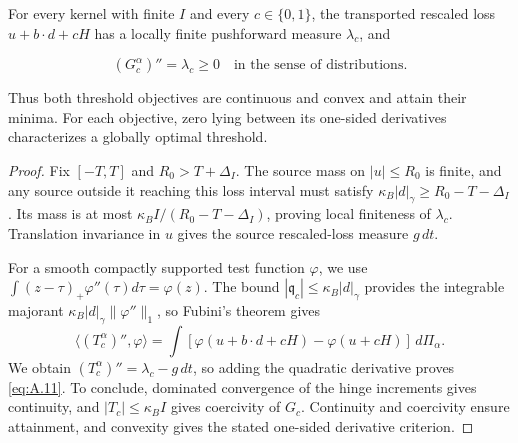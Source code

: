 \begin{lemma}\label{lem:threshold-convexity} For every kernel with finite \(I\) and every \(c\in\{0,1\}\), the transported rescaled loss \(u+b\cdot d+cH\) has a locally finite pushforward measure \(\lambda_c\), and

\begin{equation}
(G_c^\alpha)''=\lambda_c\ge0
\quad\text{in the sense of distributions.}
\tag{A.11}\label{eq:A.11}
\end{equation}

Thus both threshold objectives are continuous and convex and attain their minima. For each objective, zero lying between its one-sided derivatives characterizes a globally optimal threshold.
\end{lemma}

\begin{proof}
Fix \([-T,T]\) and \(R_0>T+\Delta_I\). The source mass on \(|u|\le R_0\) is finite, and any source outside it reaching this loss interval must satisfy \(\kappa_B|d|_\gamma\ge R_0-T-\Delta_I\). Its mass is at most \(\kappa_BI/(R_0-T-\Delta_I)\), proving local finiteness of \(\lambda_c\). Translation invariance in \(u\) gives the source rescaled-loss measure \(g\,dt\).

For a smooth compactly supported test function \(\varphi\), we use \(\int(z-\tau)_+\varphi''(\tau)d\tau=\varphi(z)\). The bound \(|\mathfrak q_c|\le \kappa_B|d|_\gamma\) provides the integrable majorant \(\kappa_B|d|_\gamma\|\varphi''\|_1\), so Fubini's theorem gives
\begin{equation}
\langle (T_c^\alpha)'',\varphi\rangle
=\int[\varphi(u+b\cdot d+cH)-\varphi(u+cH)]\,d\Pi_\alpha.
\tag{A.12}\label{eq:A.12}
\end{equation}
We obtain \((T_c^\alpha)''=\lambda_c-g\,dt\), so adding the quadratic derivative proves \eqref{eq:A.11}. To conclude, dominated convergence of the hinge increments gives continuity, and \(|T_c|\le\kappa_BI\) gives coercivity of \(G_c\). Continuity and coercivity ensure attainment, and convexity gives the stated one-sided derivative criterion.
\end{proof}

